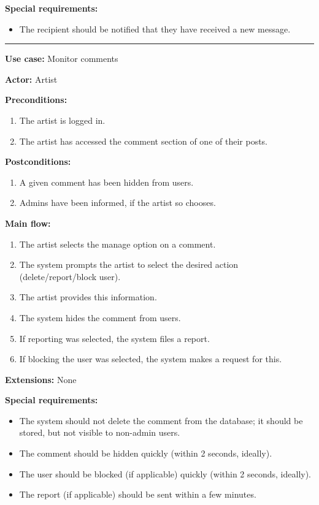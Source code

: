 \documentclass{article}
\begin{document}
{\bfseries Special requirements:}
\begin{itemize}
	\item The recipient should be notified that they have received a new message.
\end{itemize}

\hrule
\bigskip


{\bfseries Use case:} Monitor comments

{\bfseries Actor:} Artist

{\bfseries Preconditions:}
\begin{enumerate}
	\item The artist is logged in.
	\item The artist has accessed the comment section of one of their posts.
\end{enumerate}

{\bfseries Postconditions:}
\begin{enumerate}
	\item A given comment has been hidden from users.
	\item Admins have been informed, if the artist so chooses.
\end{enumerate}

{\bfseries Main flow:}
\begin{enumerate}
	\item The artist selects the manage option on a comment.
	\item The system prompts the artist to select the desired action (delete/report/block user).
	\item The artist provides this information.
	\item The system hides the comment from users.
	\item If reporting was selected, the system files a report.
	\item If blocking the user was selected, the system makes a request for this.
\end{enumerate}

{\bfseries Extensions:}
None

{\bfseries Special requirements:}
\begin{itemize}
	\item The system should not delete the comment from the database; it should be stored, but not visible to non-admin users.
	\item The comment should be hidden quickly (within 2 seconds, ideally).
	\item The user should be blocked (if applicable) quickly (within 2 seconds, ideally).
	\item The report (if applicable) should be sent within a few minutes.
\end{itemize}
\end{document}

